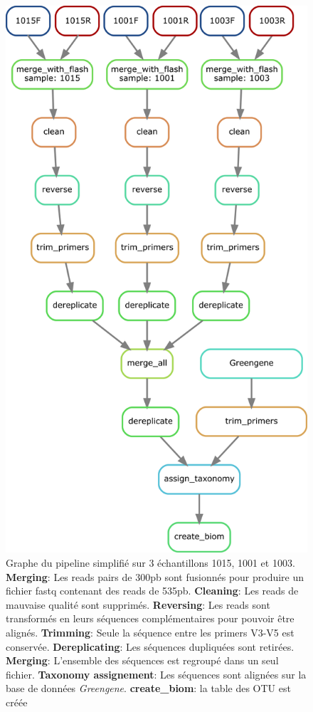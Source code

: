 \documentclass[12pt,a4paper]{article}
\begin{document}
\begin{figure}[!ht]
\begin{center}
\includegraphics[scale=0.5]{img/pipeline_trio.png}\hfill
\end{center}
\caption{Graphe du pipeline simplifié sur 3 échantillons 1015, 1001 et 1003.\\ \textbf{Merging}: Les reads pairs de 300pb sont fusionnés  pour produire un fichier fastq contenant des reads de 535pb. \textbf{Cleaning}: Les reads de mauvaise qualité sont supprimés. \textbf{Reversing}: Les reads sont transformés en leurs séquences complémentaires pour pouvoir être alignés. \textbf{Trimming}: Seule la séquence entre les primers V3-V5 est conservée. \textbf{Dereplicating}: Les séquences dupliquées sont retirées. \textbf{Merging}: L'ensemble des séquences est regroupé dans un seul fichier. \textbf{Taxonomy assignement}: Les séquences sont alignées sur la base de données \textit{Greengene}. \textbf{create\_biom}: la table des OTU est créée }
\label{pipeline_trio}
\end{figure}
\end{document}

